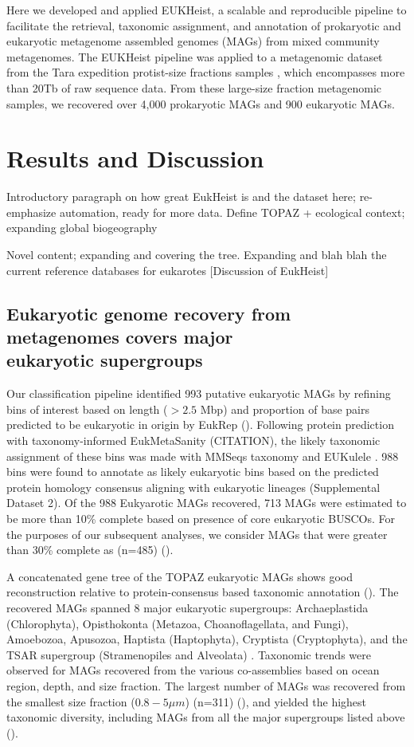 \documentclass[12pt]{article}
\numberwithin{equation}{section}
\begin{document}
Here we developed and applied EUKHeist, a scalable and reproducible pipeline to facilitate the retrieval, taxonomic assignment, and annotation of prokaryotic and eukaryotic metagenome assembled genomes (MAGs) from mixed community metagenomes. The EUKHeist pipeline was applied to a metagenomic dataset from the Tara expedition protist-size fractions samples \citep{Carradec2018global}, which encompasses more than 20Tb of raw sequence data. From these large-size fraction metagenomic samples, we recovered over 4,000 prokaryotic MAGs and 900 eukaryotic MAGs. 

\section*{Results and Discussion}

Introductory paragraph on how great EukHeist is and the dataset here; re-emphasize automation, ready for more data. Define TOPAZ + ecological context; expanding global biogeography 

Novel content; expanding and covering the tree. Expanding and blah blah the current reference databases for eukarotes [Discussion of EukHeist]

\subsection*{Eukaryotic genome recovery from metagenomes covers major \\ eukaryotic supergroups}
Our classification pipeline identified 993 putative eukaryotic MAGs by refining bins of interest based on length ($>2.5$ Mbp) and proportion of base pairs predicted to be eukaryotic in origin by EukRep (). Following protein prediction with taxonomy-informed EukMetaSanity (CITATION), the likely taxonomic assignment of these bins was made with MMSeqs taxonomy \citep{Steinegger2018} and EUKulele \citep{Krinos2021EUKulele}. 988 bins were found to annotate as likely eukaryotic bins based on the predicted protein homology consensus aligning with eukaryotic lineages (Supplemental Dataset 2). Of the 988 Eukyarotic MAGs recovered, 713 MAGs were estimated to be more than 10\% complete based on presence of core eukaryotic BUSCOs. For the purposes of our subsequent analyses, we consider MAGs that were greater than 30\% complete as (n=485) (). 

A concatenated gene tree of the TOPAZ eukaryotic MAGs shows good reconstruction relative to protein-consensus based taxonomic annotation (). The recovered MAGs spanned 8 major eukaryotic supergroups: Archaeplastida (Chlorophyta), Opisthokonta (Metazoa, Choanoflagellata, and Fungi), Amoebozoa, Apusozoa, Haptista (Haptophyta), Cryptista (Cryptophyta), and the TSAR supergroup (Stramenopiles and Alveolata) \citep{Burki_2020}. Taxonomic trends were observed for MAGs recovered from the various co-assemblies based on ocean region, depth, and size fraction. The largest number of MAGs was recovered from the smallest size fraction ($0.8-5 \mu m$) (n=311) (), and yielded the highest taxonomic diversity, including MAGs from all the major supergroups listed above (). 
\end{document}
